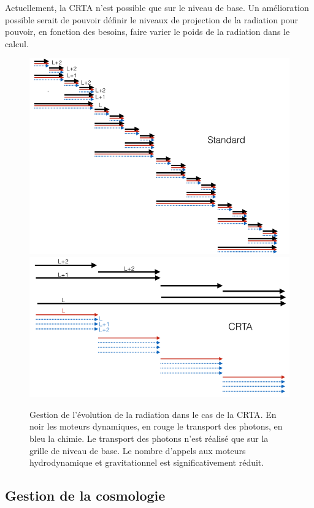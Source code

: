 Actuellement, la \ac{CRTA} n'est possible que sur le niveau de base.
Un amélioration possible serait de pouvoir définir le niveaux de projection de la radiation pour pouvoir, en fonction des besoins, faire varier le poids de la radiation dans le calcul.


\begin{figure}
\includegraphics[width=.95\linewidth]{img/02/revz_crad_std.png}
\includegraphics[width=.95\linewidth]{img/02/revz_crad.png}
\caption[CRTA]{Gestion de l'évolution de la radiation dans le cas de la \ac{CRTA}.
En noir les moteurs dynamiques, en rouge le transport des photons, en bleu la chimie.
Le transport des photons n'est réalisé que sur la grille de niveau de base.
Le nombre d'appels aux moteurs hydrodynamique et gravitationnel est significativement réduit. 
\label{fig:CRTA}}
\end{figure}


\subsection{Gestion de la cosmologie}
\label{sec:supercomobil}

